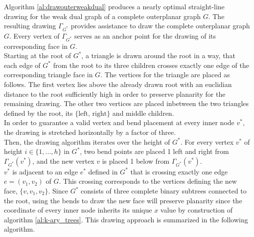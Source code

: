 Algorithm \ref{al:drawouterweakdual} produces a nearly optimal straight-line drawing for the weak dual graph of a complete outerplanar graph $G$. The resulting drawing $\Gamma_{G^*}$ provides assistance to draw the complete outerplanar graph $G$. Every vertex of $\Gamma_{G^*}$ serves as an anchor point for the drawing of its corresponding face in $G$.\\
Starting at the root of $G^*$, a triangle is drawn around the root in a way, that each edge of $G^*$ from the root to its three children crosses exactly one edge of the corresponding triangle face in $G$. The vertices for the triangle are placed as follows. The first vertex lies above the already drawn root with an euclidian distance to the root sufficiently high in order to preserve planarity for the remaining drawing. The other two vertices are placed inbetween the two triangles defined by the root, its $\{\text{left, right}\}$ and middle children.\\
In order to guarantee a valid vertex and bend placement at every inner node $v^*$, the drawing is stretched horizontally by a factor of three.\\
Then, the drawing algorithm iterates over the height of $G^*$. For every vertex $v^*$ of height $i\in \{1,...,h\}$ in $G^*$, two bend points are placed 1 \UL left and right from $\Gamma_{G^*}(v^*)$, and the new vertex $v$ is placed 1 \UL below from $\Gamma_{G^*}(v^*)$.\\
$v^*$ is adjacent to an edge $e^*$ defined in $G^*$ that is crossing exactly one edge $e = (v_1,v_2)$ of $G$. This crossing corresponds to the vertices defining the new face, $\{v, v_1, v_2\}$. Since $G^*$ consists of three complete binary subtrees connected to the root, using the bends to draw the new face will preserve planarity since the coordinate of every inner node inherits its unique $x$ value by construction of algorithm \ref{al:k-ary_trees}. 
This drawing approach is summarized in the following algorithm.\\
